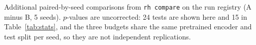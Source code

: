 \begin{table}[t]\centering\footnotesize\caption{Additional paired-by-seed comparisons from \texttt{rh compare} on the run registry (A minus B, 5 seeds). $p$-values are uncorrected: 24 tests are shown here and 15 in Table~\ref{tab:stats}, and the three budgets share the same pretrained encoder and test split per seed, so they are not independent replications.}\label{tab:extra}
\end{table}
